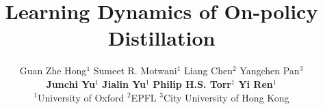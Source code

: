 \documentclass{article}
\title{Learning Dynamics of On-policy Distillation}
\author{Guan Zhe Hong$^{1}$ \quad Sumeet R. Motwani$^{1}$ \quad  Liang Chen$^{2}$ \quad Yangchen Pan$^{3}$ \\
\textbf{Junchi Yu}$^{1}$ \quad \textbf{Jialin Yu}$^{1}$ \quad \textbf{Philip H.S. Torr}$^{1}$ \quad \textbf{Yi Ren}$^{1}$\\
$^1$University of Oxford \quad $^2$EPFL \quad $^3$City University of Hong Kong
}
\theoremstyle{plain}
\theoremstyle{definition}
\theoremstyle{remark}
\begin{document}
\maketitle

\begin{abstract}

\end{abstract}


















\appendix
\clearpage

\FloatBarrier
\clearpage

\FloatBarrier
\clearpage

\FloatBarrier
{}

\FloatBarrier
{}

\FloatBarrier
%
{}

\FloatBarrier
\end{document}
